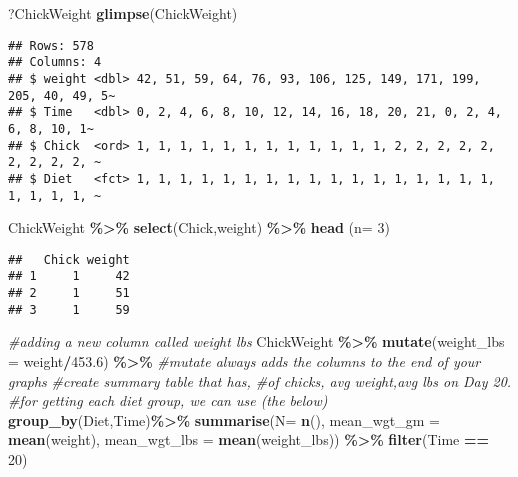 \documentclass[
]{article}
\newenvironment{Shaded}{\begin{snugshade}}{\end{snugshade}}
\newcommand{\AttributeTok}[1]{\textcolor[rgb]{0.13,0.29,0.53}{#1}}
\newcommand{\CommentTok}[1]{\textcolor[rgb]{0.56,0.35,0.01}{\textit{#1}}}
\newcommand{\DecValTok}[1]{\textcolor[rgb]{0.00,0.00,0.81}{#1}}
\newcommand{\FloatTok}[1]{\textcolor[rgb]{0.00,0.00,0.81}{#1}}
\newcommand{\FunctionTok}[1]{\textcolor[rgb]{0.13,0.29,0.53}{\textbf{#1}}}
\newcommand{\NormalTok}[1]{#1}
\newcommand{\SpecialCharTok}[1]{\textcolor[rgb]{0.81,0.36,0.00}{\textbf{#1}}}
\begin{document}
\begin{Shaded}
\begin{Highlighting}[]
\NormalTok{?ChickWeight}
\FunctionTok{glimpse}\NormalTok{(ChickWeight)}
\end{Highlighting}
\end{Shaded}

\begin{verbatim}
## Rows: 578
## Columns: 4
## $ weight <dbl> 42, 51, 59, 64, 76, 93, 106, 125, 149, 171, 199, 205, 40, 49, 5~
## $ Time   <dbl> 0, 2, 4, 6, 8, 10, 12, 14, 16, 18, 20, 21, 0, 2, 4, 6, 8, 10, 1~
## $ Chick  <ord> 1, 1, 1, 1, 1, 1, 1, 1, 1, 1, 1, 1, 2, 2, 2, 2, 2, 2, 2, 2, 2, ~
## $ Diet   <fct> 1, 1, 1, 1, 1, 1, 1, 1, 1, 1, 1, 1, 1, 1, 1, 1, 1, 1, 1, 1, 1, ~
\end{verbatim}

\begin{Shaded}
\begin{Highlighting}[]
\NormalTok{ChickWeight }\SpecialCharTok{\%\textgreater{}\%}
  \FunctionTok{select}\NormalTok{(Chick,weight) }\SpecialCharTok{\%\textgreater{}\%}
  \FunctionTok{head}\NormalTok{ (}\AttributeTok{n=} \DecValTok{3}\NormalTok{)}
\end{Highlighting}
\end{Shaded}

\begin{verbatim}
##   Chick weight
## 1     1     42
## 2     1     51
## 3     1     59
\end{verbatim}

\begin{Shaded}
\begin{Highlighting}[]
\CommentTok{\#adding a new column called weight lbs}
\NormalTok{ChickWeight }\SpecialCharTok{\%\textgreater{}\%}
  \FunctionTok{mutate}\NormalTok{(}\AttributeTok{weight\_lbs =}\NormalTok{ weight}\SpecialCharTok{/}\FloatTok{453.6}\NormalTok{) }\SpecialCharTok{\%\textgreater{}\%}
\CommentTok{\#mutate always adds the columns to the end of your graphs}
\CommentTok{\#create summary table that has, \#of chicks, avg weight,avg lbs on Day 20.}
  \CommentTok{\#for getting each diet group, we can use (the below) }
 \FunctionTok{group\_by}\NormalTok{(Diet,Time)}\SpecialCharTok{\%\textgreater{}\%}
  \FunctionTok{summarise}\NormalTok{(}\AttributeTok{N=} \FunctionTok{n}\NormalTok{(), }\AttributeTok{mean\_wgt\_gm =} \FunctionTok{mean}\NormalTok{(weight),}
            \AttributeTok{mean\_wgt\_lbs =} \FunctionTok{mean}\NormalTok{(weight\_lbs)) }\SpecialCharTok{\%\textgreater{}\%}
            \FunctionTok{filter}\NormalTok{(Time }\SpecialCharTok{==} \DecValTok{20}\NormalTok{)}
\end{Highlighting}
\end{Shaded}
\end{document}
